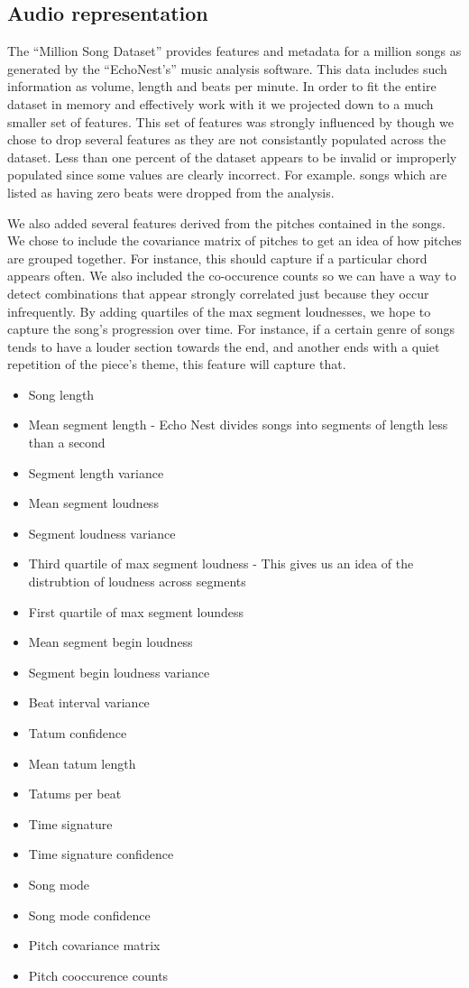 \documentclass[a4paper,10pt]{article}
\begin{document}
\subsection{Audio representation}
The ``Million Song Dataset'' provides features and metadata for a million songs as generated by the ``EchoNest's'' music analysis software. This data includes such information as volume, length and beats per minute. In order to fit the entire dataset in memory and effectively work with it we projected down to a much smaller set of features. This set of features was strongly influenced by \cite{Slaney_learninga} though we chose to drop several features as they are not consistantly populated across the dataset. Less than one percent of the dataset appears to be invalid or improperly populated since some values are clearly incorrect. For example. songs which are listed as having zero beats were dropped from the analysis. 

We also added several features derived from the pitches contained in the songs. We chose to include the covariance matrix of pitches to get an idea of how pitches are grouped together. For instance, this should capture if a particular chord appears often. We also included the co-occurence counts so we can have a way to detect combinations that appear strongly correlated just because they occur infrequently. By adding quartiles of the max segment loudnesses, we hope to capture the song's progression over time. For instance, if a certain genre of songs tends to have a louder section towards the end, and another ends with a quiet repetition of the piece's theme, this feature will capture that.

\begin{itemize}
 \item Song length 
 \item Mean segment length - Echo Nest divides songs into segments of length less than a second
 \item Segment length variance
 \item Mean segment loudness
 \item Segment loudness variance
 \item Third quartile of max segment loudness - This gives us an idea of the distrubtion of loudness across segments
 \item First quartile of max segment loundess
 \item Mean segment begin loudness
 \item Segment begin loudness variance
 \item Beat interval variance
 \item Tatum confidence
 \item Mean tatum length
 \item Tatums per beat
 \item Time signature
 \item Time signature confidence
 \item Song mode
 \item Song mode confidence
 \item Pitch covariance matrix
 \item Pitch cooccurence counts
\end{itemize}
\end{document}
